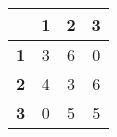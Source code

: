 \begin{tabular}{l|ccc}
\toprule
&\textbf{1} & \textbf{2} & \textbf{3}\\
\midrule
\textbf{1} & 3 & 6 & 0\\
\textbf{2} & 4 & 3 & 6\\
\textbf{3} & 0 & 5 & 5\\
\bottomrule
\end{tabular}
